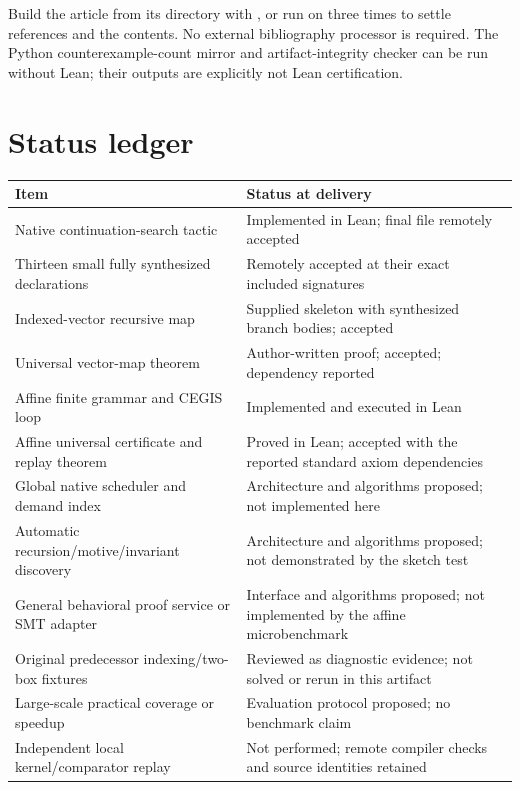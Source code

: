 Build the article from its directory with , or run  on  three times to settle references and the contents. No external bibliography processor is required. The Python counterexample-count mirror and artifact-integrity checker can be run without Lean; their outputs are explicitly not Lean certification.

\section{Status ledger}
\label{app:status}

\begin{longtable}{@{}L{0.35\textwidth}L{0.58\textwidth}@{}}
\toprule
Item & Status at delivery \\
\midrule
\endhead
\bottomrule
\endfoot
Native continuation-search tactic & Implemented in Lean; final file remotely accepted \\
Thirteen small fully synthesized declarations & Remotely accepted at their exact included signatures \\
Indexed-vector recursive map & Supplied skeleton with synthesized branch bodies; accepted \\
Universal vector-map theorem & Author-written proof; accepted;  dependency reported \\
Affine finite grammar and CEGIS loop & Implemented and executed in Lean \\
Affine universal certificate and replay theorem & Proved in Lean; accepted with the reported standard axiom dependencies \\
Global native scheduler and demand index & Architecture and algorithms proposed; not implemented here \\
Automatic recursion/motive/invariant discovery & Architecture and algorithms proposed; not demonstrated by the sketch test \\
General behavioral proof service or SMT adapter & Interface and algorithms proposed; not implemented by the affine microbenchmark \\
Original predecessor indexing/two-box fixtures & Reviewed as diagnostic evidence; not solved or rerun in this artifact \\
Large-scale practical coverage or speedup & Evaluation protocol proposed; no benchmark claim \\
Independent local kernel/comparator replay & Not performed; remote compiler checks and source identities retained \\
\end{longtable}
